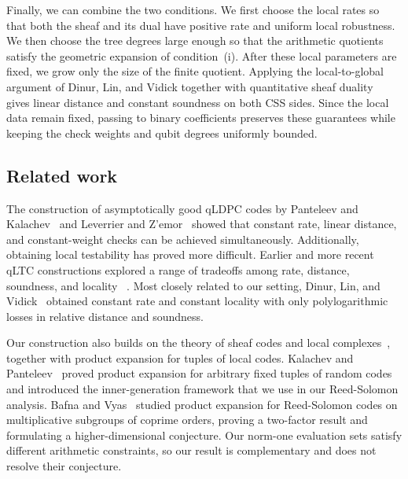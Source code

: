 \documentclass[11pt,letterpaper]{article}
\theoremstyle{definition}
\theoremstyle{remark}
\begin{document}
    Finally, we can combine the two conditions. We first choose the local rates so that both the sheaf and its dual have positive rate and uniform local robustness. We then choose the tree degrees large enough so that the arithmetic quotients satisfy the geometric expansion of condition~(i). After these local parameters are fixed, we grow only the size of the finite quotient. Applying the local-to-global argument of Dinur, Lin, and Vidick together with quantitative sheaf duality~\cite{LiEtAl2025} gives linear distance and constant soundness on both CSS sides. Since the local data remain fixed, passing to binary coefficients preserves these guarantees while keeping the check weights and qubit degrees uniformly bounded. 

\subsection{Related work}
\label{related-work}

The construction of asymptotically good qLDPC codes by Panteleev and
Kalachev~\cite{PanteleevKalachev2022} and Leverrier and
Z{'e}mor~\cite{LeverrierZemor2022} showed that constant rate, linear
distance, and constant-weight checks can be achieved simultaneously.
Additionally, obtaining local testability has proved more difficult.
Earlier and more recent qLTC constructions explored a range of tradeoffs
among rate, distance, soundness, and locality
~\cite{QuantumCodesFromHighDimensionalManifolds,
TowardsLocalTestabilityForQuantumCoding,CrossEtAl2024,
GeneralDistanceBalancingForQLTCs,TradeoffConstructionsForQLTCs}.
Most closely related to our setting, Dinur, Lin, and
Vidick~\cite{DinurLinVidick2024} obtained constant rate and constant
locality with only polylogarithmic losses in relative distance and
soundness.

Our construction also builds on the theory of sheaf codes and local
complexes~\cite{PanteleevKalachev2024}, together with product expansion
for tuples of local codes.  Kalachev and
Panteleev~\cite{KalachevPanteleev2025} proved product expansion for
arbitrary fixed tuples of random codes and introduced the
inner-generation framework that we use in our Reed-Solomon analysis.
Bafna and Vyas~\cite{BafnaVyas2026} studied product expansion for
Reed-Solomon codes on multiplicative subgroups of coprime orders,
proving a two-factor result and formulating a higher-dimensional
conjecture.  Our norm-one evaluation sets satisfy different arithmetic
constraints, so our result is complementary and does not resolve their
conjecture.
\end{document}
